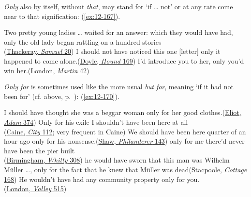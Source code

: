 \textit{Only} also by itself, without \textit{that}, may stand for `if {\dots} not' or at any rate come near to that signification: (\ref{ex:12-167}).

\ea \label{ex:12-167}
\ea
Two pretty young ladies {\dots} waited for an answer: which they would have had, only the old lady began rattling on a hundred stories\\\hfill(\href{https://archive.org/details/historyofsamuelt00thacrich/page/24/mode/2up?q=%22began+rattling%22&view=theater}{Thackeray, \textit{Samuel} 20}) %
\ex
I should not have noticed this one [letter] only it happened to come alone.\hfill(\href{https://archive.org/details/houndofbaskervil00doylrich/page/220/mode/2up?view=theater&q=%22should+not+have+noticed%22}{Doyle, \textit{Hound} 169})
\ex
I'd introduce you to her, only you'd win her.\hfill(\href{https://archive.org/details/martineden00lond/page/40/mode/2up?q=%22I%27d+introduce+you+to+her%22&view=theater}{London, \textit{Martin} 42})
\z
\z

\textit{Only for} is sometimes used like the more usual \textit{but for}, meaning `if it had not been for' (cf. above, p.~\pageref{but_for}): (\ref{ex:12-170}).

\ea \label{ex:12-170}
\ea
I should have thought she was a beggar woman only for her good clothes.\hfill(\href{https://archive.org/details/adambede00eliouoft/page/n393/mode/2up?q=%22beggar-woman%22&view=theater}{Eliot, \textit{Adam} 374}) %
\ex
Only for his exile I shouldn't have been here at all\\\hfill(\href{https://archive.org/details/eternalcity00cainiala/page/116/mode/2up?view=theater&q=%22only+for+his+exile%22}{Caine, \textit{City} 112}; very frequent in Caine)
\ex
We should have been here quarter of an hour ago only for his nonsense.\hfill(\href{https://archive.org/details/philanderertopic00shawrich/page/142/mode/2up?q=%22quarter+of+an+hour+ago%22&view=theater}{Shaw, \textit{Philanderer} 143})
\ex
only for me there'd never have been the pier built\\\hfill(\href{https://archive.org/details/advofdrwhitty00birmiala/page/308/mode/2up?q=%22only+for+me+there%27d%22&view=theater}{Birmingham, \textit{Whitty} 308})
\ex
he would have sworn that this man was Wilhelm Müller \dots, only for the fact that he knew that Müller was dead\hfill(\href{https://archive.org/details/cihm_65535/page/n177/mode/2up?q=%22would+have+sworn+that+this+man%22&view=theater}{Stacpoole, \textit{Cottage} 168}) %
\ex
He wouldn't have had any community property only for you.\\\hfill(\href{https://archive.org/details/valleyofmoon00londrich/page/n523/mode/2up?view=theater&q=%22wouldn%27t+have+had+any+community%22}{London, \textit{Valley} 515})
\z
\z

